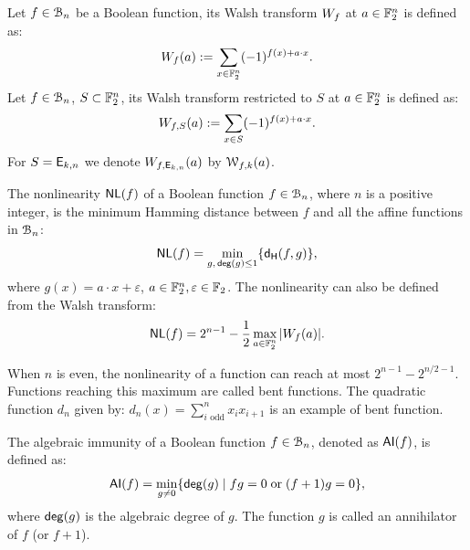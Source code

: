 \documentclass[11pt]{llncs}
\begin{document}
\begin{definition}\label{def:walsh_transform}
	Let $f\in \mathcal{B}_{n}$ be a Boolean function, its Walsh transform $W_{f}$ at $a \in \mathbb{F}_2^n$ is defined as:
	\[  W_{f} (a) := \sum_{x \in \mathbb{F}_2^n} (-1)^{f(x) +  a \cdot x }.\]
	Let $f\in \mathcal{B}_{n}$, $S \subset \mathbb{F}_2^n$, its Walsh transform restricted to $S$ at $a \in \mathbb{F}_2^n$ is defined as:
	\[  W_{f,S} (a) := \sum_{x\in S} (-1)^{f(x)+a \cdot x}.\]
	For $S=\mathsf{E}_{k,n}$ we denote $W_{f,\mathsf{E}_{k,n}} (a)$ by $\mathcal{W}_{f,k}(a)$.%
\end{definition}


	


\begin{definition}[Nonlinearity %
	] \label{def:nl}
	The nonlinearity $\mathsf{NL}(f)$ of a Boolean function $f\in \mathcal{B}_n$, where $n$ is a positive integer, is the minimum Hamming distance between $f$ and all the affine functions in $\mathcal{B}_n$:
	\[ \mathsf{NL}(f) = \min_{g,\, \mathsf{deg}(g)\leq 1} \{ \mathsf{d_H}(f,g) \}{,} \]
	where $g(x)=a\cdot x+\varepsilon$, $a\in \mathbb{F}_2^n, \varepsilon\in \mathbb{F}_2$. 	
	The nonlinearity can also be defined from the Walsh transform:
	\[ \mathsf{NL}(f) = 2^{n-1}- \frac{1}{2} \max_{a\in \mathbb{F}_2^n}{|W_{f}(a)|}. \]
\end{definition}

When $n$ is even, the nonlinearity of a function can reach at most $2^{n-1}-2^{n/2 -1}$. Functions reaching this maximum are called bent functions. The quadratic function $d_n$ given by: $d_n(x)=\sum_{i \text{ odd}}^n x_i x_{i+1}$ is an example of bent function.






\begin{definition} \label{def:ai}
	The algebraic immunity of a Boolean function $f\in \mathcal{B}_{n}$, denoted as $\mathsf{AI}(f)$, is defined as:
	\[ \mathsf{AI}(f) = \min_{g \neq 0}\{ \mathsf{deg}(g) \; | \; fg = 0 \; \text{or} \; (f + 1)g = 0 \}{,} \]
	where $\mathsf{deg}(g)$ is the algebraic degree of $g$.
	The function $g$ is called an annihilator of $f$ (or $f + 1$). 
\end{definition}
\end{document}
